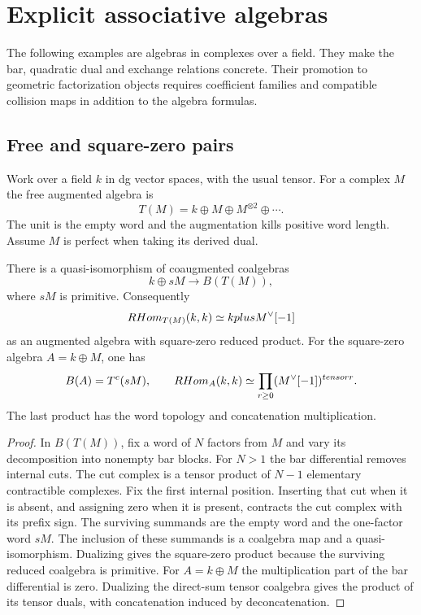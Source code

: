 \chapter{Explicit associative algebras}

The following examples are algebras in complexes over a field.
They make the bar, quadratic dual and exchange relations concrete.
Their promotion to geometric factorization objects requires coefficient families
and compatible collision maps in addition to the algebra formulas.

\section{Free and square-zero pairs}
Work over a field $k$ in dg vector spaces, with the usual tensor.
For a complex $M$ the free augmented algebra is
\[
 T(M)=k\oplus M\oplus M^{\otimes2}\oplus\cdots.
\]
The unit is the empty word and the augmentation kills positive word length.
Assume $M$ is perfect when taking its derived dual.

\begin{theorem}
There is a quasi-isomorphism of coaugmented coalgebras
\[
 k\oplus sM\longrightarrow B(T(M)),
\]
where $sM$ is primitive. Consequently
\[
 RHom_{T(M)}(k,k)\simeq kplus M^\vee[-1]
\]
as an augmented algebra with square-zero reduced product.
For the square-zero algebra $A=k\oplus M$, one has
\[
 B(A)=T^c(sM),\qquad
 RHom_A(k,k)\simeq\prod_{r\ge0}(M^\vee[-1])^{tensor r}.
\]
The last product has the word topology and concatenation multiplication.
\end{theorem}
\begin{proof}
In $B(T(M))$, fix a word of $N$ factors from $M$ and vary its decomposition into
nonempty bar blocks. For $N>1$ the bar differential removes internal cuts.
The cut complex is a tensor product of $N-1$ elementary contractible complexes.
Fix the first internal position. Inserting that cut when it is absent, and assigning zero when it is present, contracts the cut complex with its prefix sign.
The surviving summands are the empty word and the one-factor word $sM$.
The inclusion of these summands is a coalgebra map and a quasi-isomorphism.
Dualizing gives the square-zero product because the surviving reduced
coalgebra is primitive. For $A=k\oplus M$ the multiplication part of the bar
differential is zero. Dualizing the direct-sum tensor coalgebra gives the
product of its tensor duals, with concatenation induced by deconcatenation.
\end{proof}

